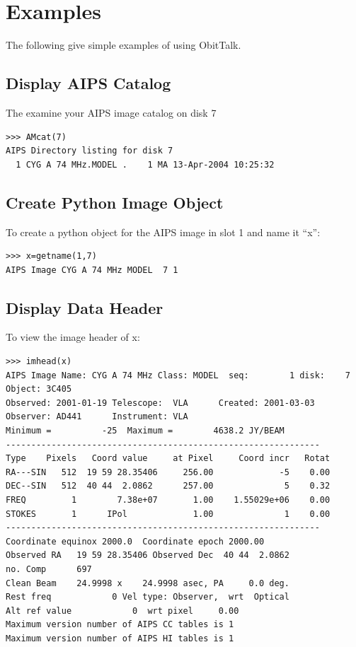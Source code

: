 \documentclass[11pt]{report}
\begin{document}
\section{Examples}
The following give simple examples of using ObitTalk.

\subsection{Display AIPS Catalog}
The examine your AIPS image catalog on disk 7
\begin{verbatim}
>>> AMcat(7)
AIPS Directory listing for disk 7
  1 CYG A 74 MHz.MODEL .    1 MA 13-Apr-2004 10:25:32     
\end{verbatim}

\subsection{Create Python Image Object}
To create a python object for the AIPS image in slot 1 and name it ``x'':
\begin{verbatim}
>>> x=getname(1,7)
AIPS Image CYG A 74 MHz MODEL  7 1
\end{verbatim}

\subsection{Display Data Header}
To view the image header of x:
\begin{verbatim}
>>> imhead(x)
AIPS Image Name: CYG A 74 MHz Class: MODEL  seq:        1 disk:    7
Object: 3C405   
Observed: 2001-01-19 Telescope:  VLA      Created: 2001-03-03
Observer: AD441      Instrument: VLA      
Minimum =          -25  Maximum =        4638.2 JY/BEAM 
--------------------------------------------------------------
Type    Pixels   Coord value     at Pixel     Coord incr   Rotat
RA---SIN   512  19 59 28.35406     256.00             -5    0.00
DEC--SIN   512  40 44  2.0862      257.00              5    0.32
FREQ         1        7.38e+07       1.00    1.55029e+06    0.00
STOKES       1      IPol             1.00              1    0.00
--------------------------------------------------------------
Coordinate equinox 2000.0  Coordinate epoch 2000.00
Observed RA   19 59 28.35406 Observed Dec  40 44  2.0862 
no. Comp      697
Clean Beam    24.9998 x    24.9998 asec, PA     0.0 deg.
Rest freq            0 Vel type: Observer,  wrt  Optical
Alt ref value            0  wrt pixel     0.00
Maximum version number of AIPS CC tables is 1 
Maximum version number of AIPS HI tables is 1 
\end{verbatim}
\end{document}
